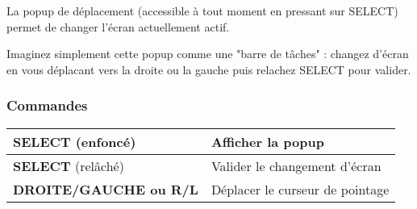 La popup de déplacement (accessible à tout moment en pressant sur SELECT) permet de changer l'écran actuellement actif.


Imaginez simplement cette popup comme une "barre de tâches" : changez d'écran en vous déplacant vers la droite ou la gauche puis relachez SELECT pour valider.

\subsubsection{Commandes}

\tablelasttail{\hline}
\begin{supertabular}{|l|l|}
\hline
    {\bf SELECT} (enfoncé) & Afficher la popup \\
    \hline
    {\bf SELECT} (relâché) & Valider le changement d'écran \\
    \hline
    {\bf DROITE/GAUCHE ou R/L} & Déplacer le curseur de pointage \\
\hline
\end{supertabular}
